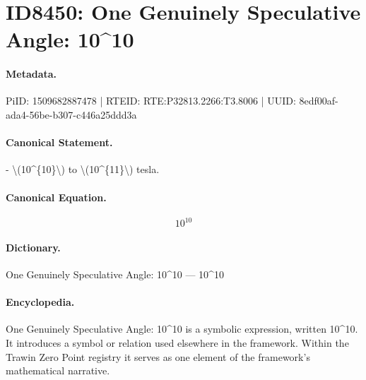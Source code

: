 \section*{ID8450: One Genuinely Speculative Angle: 10\textasciicircum{}10}
\paragraph{Metadata.}
PiID: 1509682887478 | RTEID: RTE:P32813.2266:T3.8006 | UUID: 8edf00af-ada4-56be-b307-c446a25ddd3a

\paragraph{Canonical Statement.}
- \textbackslash{}(10\textasciicircum{}\{10\}\textbackslash{}) to \textbackslash{}(10\textasciicircum{}\{11\}\textbackslash{}) tesla.

\paragraph{Canonical Equation.}
\[
10^{10}
\]

\paragraph{Dictionary.}
One Genuinely Speculative Angle: 10\textasciicircum{}10 — 10\textasciicircum{}10

\paragraph{Encyclopedia.}
One Genuinely Speculative Angle: 10\textasciicircum{}10 is a symbolic expression, written 10\textasciicircum{}10. It introduces a symbol or relation used elsewhere in the framework. Within the Trawin Zero Point registry it serves as one element of the framework's mathematical narrative.
